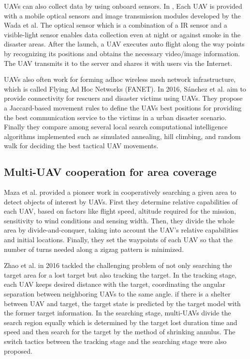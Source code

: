 \documentclass{ieeeaccess}
\begin{document}
UAVs can also collect data by using onboard sensors. In \cite{Wada2015}, Each UAV is provided with a mobile optical sensors and image transmission modules developed by the Wada et al. The optical sensor which is a combination of a IR sensor and a visible-light sensor enables data collection even at night or against smoke in the disaster areas.
After the launch, a UAV executes auto flight along the way points by recognizing its positions and  obtains the necessary video/image information. The UAV transmits it to the server and shares it with users via the Internet.

UAVs also often work for forming adhoc wireless mesh network infrastructure, which is called Flying Ad Hoc Networks (FANET)\cite{Bekmezci2013}.
In 2016, S\'anchez et al. aim to provide connectivity for rescuers and disaster victims using UAVs\cite{Garcia2016}.
They propose a Jaccard-based movement rules to define the UAVs best positions for providing the best communication service to the victims in a urban disaster scenario.
Finally they compare among several local search computational intelligence algorithms implemented such as simulated annealing, hill climbing, and random walk for deciding the best tactical UAV movements.

\subsection{Multi-UAV cooperation for area coverage}\label{cover}
Maza et al. provided a pioneer work in cooperatively searching a given area to detect objects of interest by UAVs\cite{Maza2007}.
First they determine relative capabilities of each UAV, based on factors like flight speed, altitude required for the mission, sensitivity to wind conditions and sensing width.
Then, they divide the whole area by divide-and-conquer, taking into account the UAV's relative capabilities and initial locations.
Finally, they set the waypoints of each UAV so that the number of turns needed along a zigzag pattern is minimized.

Zhao et al. in 2016 tackled the challenging problem of not only searching the target area for a lost target but also tracking the target\cite{chang2016}.
In the tracking stage, each UAV keeps desired distance with the target, coordinating the angular separation between neighboring UAVs to the same angle.
if there is a shelter between UAV and target, the target state is predicted by the target model with the former target information.  
In the searching stage, multi-UAVs divide the search region equally which is determined by the target lost duration time and speed and then search for the target by the method of shrinking annulus.
The switch tactics between the tracking stage and the searching stage were also proposed. 
\end{document}
